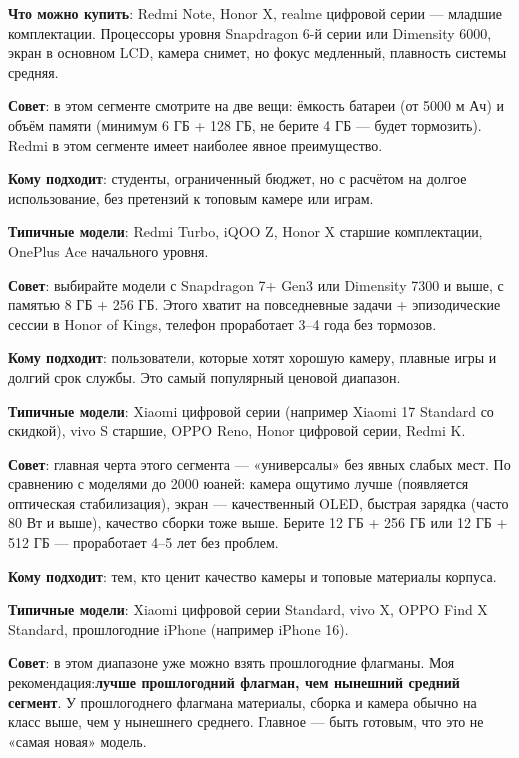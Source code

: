 \textbf{Что можно купить}: Redmi Note, Honor X, realme цифровой серии — младшие комплектации. Процессоры уровня Snapdragon 6-й серии или Dimensity 6000, экран в основном LCD, камера снимет, но фокус медленный, плавность системы средняя.

\textbf{Совет}: в этом сегменте смотрите на две вещи: ёмкость батареи (от 5000 м Ач) и объём памяти (минимум 6 ГБ + 128 ГБ, не берите 4 ГБ — будет тормозить). Redmi в этом сегменте имеет наиболее явное преимущество.


\textbf{Кому подходит}: студенты, ограниченный бюджет, но с расчётом на долгое использование, без претензий к топовым камере или играм.

\textbf{Типичные модели}: Redmi Turbo, iQOO Z, Honor X старшие комплектации, OnePlus Ace начального уровня.

\textbf{Совет}: выбирайте модели с Snapdragon 7+ Gen3 или Dimensity 7300 и выше, с памятью 8 ГБ + 256 ГБ. Этого хватит на повседневные задачи + эпизодические сессии в Honor of Kings, телефон проработает 3–4 года без тормозов.


\textbf{Кому подходит}: пользователи, которые хотят хорошую камеру, плавные игры и долгий срок службы. Это самый популярный ценовой диапазон.

\textbf{Типичные модели}: Xiaomi цифровой серии (например Xiaomi 17 Standard со скидкой), vivo S старшие, OPPO Reno, Honor цифровой серии, Redmi K.

\textbf{Совет}: главная черта этого сегмента — «универсалы» без явных слабых мест. По сравнению с моделями до 2000 юаней: камера ощутимо лучше (появляется оптическая стабилизация), экран — качественный OLED, быстрая зарядка (часто 80 Вт и выше), качество сборки тоже выше. Берите 12 ГБ + 256 ГБ или 12 ГБ + 512 ГБ — проработает 4–5 лет без проблем.


\textbf{Кому подходит}: тем, кто ценит качество камеры и топовые материалы корпуса.

\textbf{Типичные модели}: Xiaomi цифровой серии Standard, vivo X, OPPO Find X Standard, прошлогодние iPhone (например iPhone 16).

\textbf{Совет}: в этом диапазоне уже можно взять прошлогодние флагманы. Моя рекомендация:\textbf{лучше прошлогодний флагман, чем нынешний средний сегмент}. У прошлогоднего флагмана материалы, сборка и камера обычно на класс выше, чем у нынешнего среднего. Главное — быть готовым, что это не «самая новая» модель.

